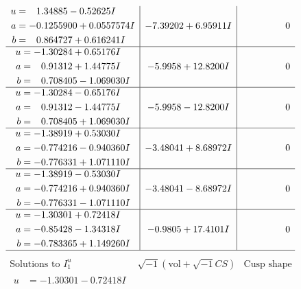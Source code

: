 \documentclass[1p]{elsarticle_modified}
\theoremstyle{definition}
\newcommand{\I}{\sqrt{-1}}
\begin{document}
$$\begin{array}{c|c|c}
\begin{aligned}
u &= \phantom{-}1.34885 - 0.52625 I \\
a &= -0.1255900 + 0.0557574 I \\
b &= \phantom{-}0.864727 + 0.616241 I\end{aligned}
 & -7.39202 + 6.95911 I & \phantom{-0.000000 } 0 \\ \hline\begin{aligned}
u &= -1.30284 + 0.65176 I \\
a &= \phantom{-}0.91312 + 1.44775 I \\
b &= \phantom{-}0.708405 - 1.069030 I\end{aligned}
 & -5.9958 + 12.8200 I & \phantom{-0.000000 } 0 \\ \hline\begin{aligned}
u &= -1.30284 - 0.65176 I \\
a &= \phantom{-}0.91312 - 1.44775 I \\
b &= \phantom{-}0.708405 + 1.069030 I\end{aligned}
 & -5.9958 - 12.8200 I & \phantom{-0.000000 } 0 \\ \hline\begin{aligned}
u &= -1.38919 + 0.53030 I \\
a &= -0.774216 - 0.940360 I \\
b &= -0.776331 + 1.071110 I\end{aligned}
 & -3.48041 + 8.68972 I & \phantom{-0.000000 } 0 \\ \hline\begin{aligned}
u &= -1.38919 - 0.53030 I \\
a &= -0.774216 + 0.940360 I \\
b &= -0.776331 - 1.071110 I\end{aligned}
 & -3.48041 - 8.68972 I & \phantom{-0.000000 } 0 \\ \hline\begin{aligned}
u &= -1.30301 + 0.72418 I \\
a &= -0.85428 - 1.34318 I \\
b &= -0.783365 + 1.149260 I\end{aligned}
 & -0.9805 + 17.4101 I & \phantom{-0.000000 } 0\\
 \hline 
 \end{array}$$\newpage$$\begin{array}{c|c|c}  
\text{Solutions to }I^u_{1}& \I (\text{vol} + \sqrt{-1}CS) & \text{Cusp shape}\\
 \hline 
\begin{aligned}
u &= -1.30301 - 0.72418 I \\

\end{aligned}
\end{array}$$
\end{document}
